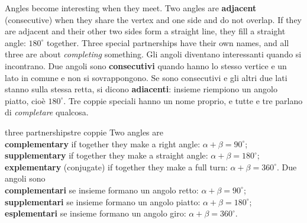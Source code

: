 \label{sec:pairs}
\begin{bi}
Angles become interesting when they meet. Two angles are \textbf{adjacent} (consecutive) when they share the vertex and one side and do not overlap. If they are adjacent and their other two sides form a straight line, they fill a straight angle: $180^\circ$ together. Three special partnerships have their own names, and all three are about \emph{completing} something.
\IT
Gli angoli diventano interessanti quando si incontrano. Due angoli sono \textbf{consecutivi} quando hanno lo stesso vertice e un lato in comune e non si sovrappongono. Se sono consecutivi e gli altri due lati stanno sulla stessa retta, si dicono \textbf{adiacenti}: insieme riempiono un angolo piatto, cioè $180^\circ$. Tre coppie speciali hanno un nome proprio, e tutte e tre parlano di \emph{completare} qualcosa.
\end{bi}

\begin{defn}{three partnerships}{tre coppie}
Two angles are\\
\textbf{complementary} if together they make a right angle: $\alpha + \beta = 90^\circ$;\\
\textbf{supplementary} if together they make a straight angle: $\alpha + \beta = 180^\circ$;\\
\textbf{explementary} (conjugate) if together they make a full turn: $\alpha + \beta = 360^\circ$.
\tcblower
Due angoli sono\\
\textbf{complementari} se insieme formano un angolo retto: $\alpha + \beta = 90^\circ$;\\
\textbf{supplementari} se insieme formano un angolo piatto: $\alpha + \beta = 180^\circ$;\\
\textbf{esplementari} se insieme formano un angolo giro: $\alpha + \beta = 360^\circ$.
\end{defn}

